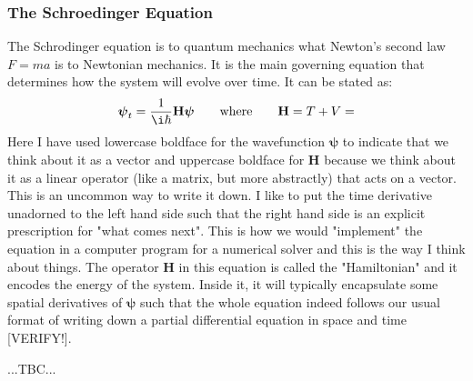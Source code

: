 
\subsubsection{The Schroedinger Equation}
The  Schrodinger equation is to quantum mechanics what Newton's second law $F = m a$ is to Newtonian mechanics. It is the main governing equation that determines how the system will evolve over time. It can be stated as:
\begin{equation}
 \boldsymbol{\psi}_{t} = \frac{1}{\i \hbar} \mathbf{H} \boldsymbol{\psi}
 \qquad \text{where} \qquad
 \mathbf{H} = T + V = 
\end{equation}
Here I have used lowercase boldface for the wavefunction $\boldsymbol{\psi}$ to indicate that we think about it as a vector and uppercase boldface for $\mathbf{H}$ because we think about it as a linear operator (like a matrix, but more abstractly) that acts on a vector. This is an uncommon way to write it down. I like to put the time derivative unadorned to the left hand side such that the right hand side is an explicit prescription for "what comes next". This is how we would "implement" the equation in a computer program for a numerical solver and this is the way I think about things. The operator $\mathbf{H}$ in this equation is called the "Hamiltonian" and it encodes the energy of the system. Inside it, it will typically encapsulate some spatial derivatives of $\boldsymbol{\psi}$ such that the whole equation indeed follows our usual format of writing down a partial differential equation in space and time [VERIFY!].

...TBC...





% 


